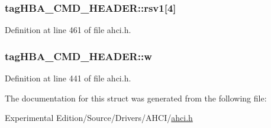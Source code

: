 \subsubsection[{\texorpdfstring{rsv1}{rsv1}}]{ tag\+H\+B\+A\+\_\+\+C\+M\+D\+\_\+\+H\+E\+A\+D\+E\+R\+::rsv1\mbox{[}4\mbox{]}}\hypertarget{structtagHBA__CMD__HEADER_a5bedafeec01a2e7db8f36591fe48c142}{}\label{structtagHBA__CMD__HEADER_a5bedafeec01a2e7db8f36591fe48c142}


Definition at line 461 of file ahci.\+h.

\subsubsection[{\texorpdfstring{w}{w}}]{ tag\+H\+B\+A\+\_\+\+C\+M\+D\+\_\+\+H\+E\+A\+D\+E\+R\+::w}\hypertarget{structtagHBA__CMD__HEADER_a1e268f69308d471e20b13dbfadc2b4ac}{}\label{structtagHBA__CMD__HEADER_a1e268f69308d471e20b13dbfadc2b4ac}


Definition at line 441 of file ahci.\+h.



The documentation for this struct was generated from the following file\+:\begin{DoxyCompactItemize}
\item 
Experimental Edition/\+Source/\+Drivers/\+A\+H\+C\+I/\hyperlink{ahci_8h}{ahci.\+h}\end{DoxyCompactItemize}
